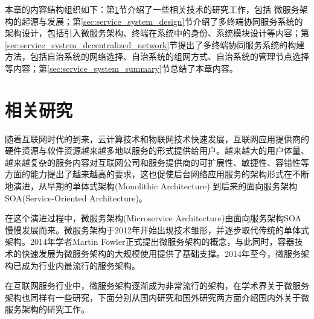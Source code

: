 本章的内容结构组织如下：第\ref{sec:service_system_related_work}节介绍了一些相关技术的研究工作，包括
微服务架构的起源与发展；第\ref{sec:service_system_design}节介绍了多终端协同服务系统的架构设计，包括引入微服务架构、终端在系统中的身份、系统模块设计等内容；第\ref{sec:service_system_decentralized_network}节提出了多终端协同服务系统的构建方法，包括自治系统的网络选择、自治系统的组网方式、自治系统的管理节点选择等内容；第\ref{sec:service_system_summary}节总结了本章内容。
\section{相关研究}\label{sec:service_system_related_work}



随着互联网时代的到来，云计算技术和物联网技术快速发展，互联网应用提供商的硬件资源与软件资源越来越多地以服务的形式提供给用户\cite{马斌2015海云协同环境下服务运营环境关键技术的探讨}。越来越大的用户体量、越来越复杂的服务内容对互联网公司和服务提供商的可扩展性、敏捷性、容错性等方面的能力提出了越来越高的要求，这也促使后台网络应用服务的架构形式在不断地演进，从早期的单体式架构(Monolithic Architecture) 到后来的面向服务架构 SOA(Service-Oriented Architecture)。

在这个演进过程中，微服务架构(Microservice Architecture)由面向服务架构SOA慢慢发展而来。微服务架构于2012年开始出现技术雏形，并逐步取代传统的单体式架构。2014年学者Martin Fowler正式提出微服务架构的概念\cite{lewis2014microservices}，与此同时，容器技术的快速发展为微服务架构的大规模使用提供了基础支撑。2014年至今，微服务架构已成为行业内最流行的服务架构。

在互联网服务行业中，微服务架构逐渐成为非常流行的架构，在学术界关于微服务架构也同样有一些研究，下面分别从国内研究和国外研究两方面介绍国内外关于微服务架构的研究工作。


